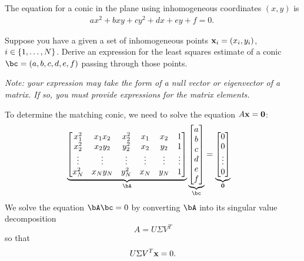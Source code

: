 \begin{problem}
  The equation for a conic in the plane using inhomogeneous
  coordinates $(x, y)$ is
  \begin{align}
    ax^2 + bxy + cy^2 + dx + ey + f = 0.~\label{eq:2.1}
  \end{align}

  \begin{enumalph}
    \item Suppose you have a given a set of inhomogeneous points
      $\mathbf{x}_i = (x_i, y_i)$, $i \in \left\{1, \ldots, N\right\}$.
      Derive an expression for the least squares estimate
      of a conic $\bc = (a, b, c, d, e, f)$ passing through those points.
      
      \step
      \emph{
        Note: your expression may take the form of a
        null vector or eigenvector of a matrix.
        If so, you must provide expressions
        for the matrix elements.
      }
      \begin{answer}
        To determine the matching conic, we need to solve the equation
        $A\mathbf{x} = \mathbf{0}$:
        \begin{align*}
          \underbrace{\begin{bmatrix}
            x_1^2 & x_1x_2 & x_2^2 & x_1 & x_2 & 1 \\
            x_2^2 & x_2y_2 & y_2^2 & x_2 & y_2 & 1 \\
            \vdots & \vdots & \vdots & \vdots & \vdots & \vdots \\
            x_N^2 & x_Ny_N & y_N^2 & x_N & y_N & 1 \\
          \end{bmatrix}}_{\bA}
          \underbrace{\begin{bmatrix}
            a \\
            b \\
            c \\
            d \\
            e \\
            f \\
          \end{bmatrix}}_{\bc}
          &=
          \underbrace{\begin{bmatrix}
            0 \\
            0 \\
            \vdots \\
            0 \\
          \end{bmatrix}}_{\mathbf{0}}
        \end{align*}
        We solve the equation $\bA\bc = 0$ by converting $\bA$ into
        its singular value decomposition
        \[
          A = U \Sigma V^T
        \]
        so that
        \[
          U \Sigma V^T \mathbf{x} = 0.
        \]


\end{answer}
\end{enumalph}
\end{problem}
